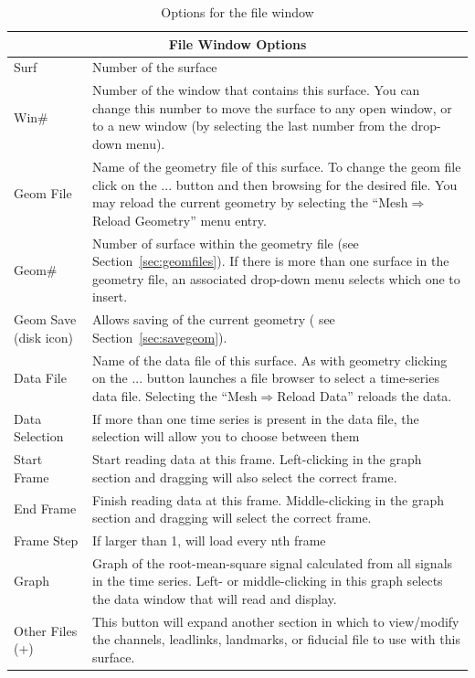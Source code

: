 \begin{table}[htbp]
\caption{\label{table:filewindow} Options for the file window}    
\begin{center}
\begin{tabular}{|l|p{4in}|} \hline
    \multicolumn{2}{|c|}{\textbf{File Window Options}} \\ \hline\hline
    Surf      &      Number of the surface \\ \hline
    Win\#      &      Number of the window that contains this surface.
          You can change this number to move the surface to any
          open window, or to a new window (by selecting the last
          number from the drop-down menu). \\ \hline
    Geom File &      Name of the geometry file of this surface.  To change
        the geom file click on the
        ... button and then browsing for the desired file. You may reload the
        current geometry by  
        selecting the ``Mesh$\Rightarrow$Reload Geometry'' 
        menu entry. \\ \hline
    Geom\#     &      Number of surface within the geometry file (see
         Section~\ref{sec:geomfiles}). 
         If there is more than one surface in the geometry
         file, an associated drop-down  menu selects which one to 
         insert.   \\ \hline
    Geom Save (disk icon) &      Allows saving of the current geometry ( see
         Section~\ref{sec:savegeom}). \\ \hline
    Data File      &   Name of the data file of this surface.
         As with geometry  clicking on the ... button launches 
         a file browser to select a time-series data file.
         Selecting the ``Mesh$\Rightarrow$Reload Data'' reloads
         the data. \\ \hline
    Data Selection &   If more than one time series is present in the data
         file, the selection will allow you to choose between them \\ \hline
    Start Frame           &   Start reading data at this frame. 
         Left-clicking 
         in the graph section and dragging will also  select the
         correct frame. \\ \hline
    End Frame             &       Finish reading data at this frame.
         Middle-clicking in the graph section and dragging 
         will  select the correct frame. \\ \hline 
    Frame Step            &       If larger than 1, \map{} will load every nth frame \\ \hline 
    Graph     &       Graph of the root-mean-square signal calculated
         from all signals in the time series.    Left- or
         middle-clicking in this graph selects the data window that
         \map{} will read and display. \\ \hline 
    Other Files (+)       &       This button will expand another section
         in which to view/modify the channels, leadlinks, 
         landmarks, or fiducial file to use with this surface. \\ \hline 
\end{tabular}
\end{center}
\end{table}
